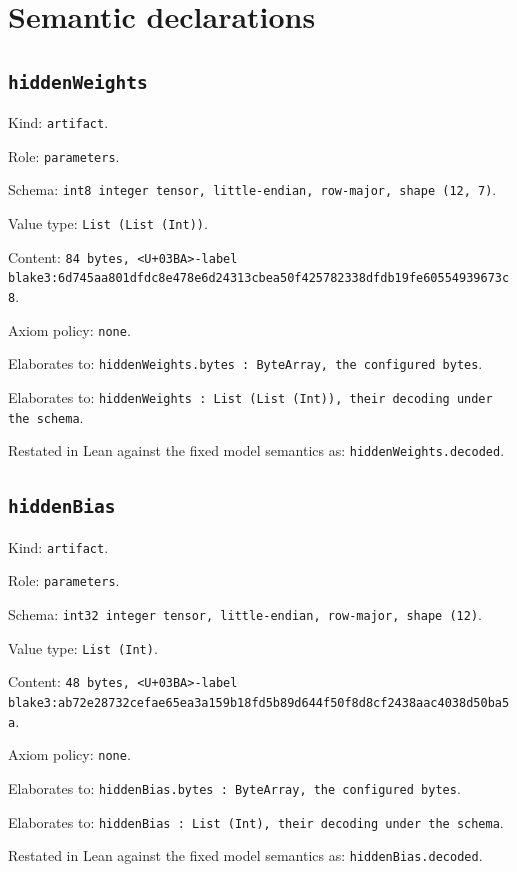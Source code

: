 \documentclass[11pt]{article}
\begin{document}
\section*{Semantic declarations}
\subsection*{\texttt{hiddenWeights}}
\noindent Kind: \texttt{artifact}.\par
\noindent Role: \texttt{parameters}.\par
\noindent Schema: \texttt{int8 integer tensor, little-endian, row-major, shape (12, 7)}.\par
\noindent Value type: \texttt{List (List (Int))}.\par
\noindent Content: \texttt{84 bytes, <U+03BA>-label blake3:6d745aa801dfdc8e478e6d24313cbea50f425782338dfdb19fe60554939673c8}.\par
\noindent Axiom policy: \texttt{none}.\par
\noindent Elaborates to: \texttt{hiddenWeights.bytes : ByteArray, the configured bytes}.\par
\noindent Elaborates to: \texttt{hiddenWeights : List (List (Int)), their decoding under the schema}.\par
\noindent Restated in Lean against the fixed model semantics as: \texttt{hiddenWeights.decoded}.\par
\subsection*{\texttt{hiddenBias}}
\noindent Kind: \texttt{artifact}.\par
\noindent Role: \texttt{parameters}.\par
\noindent Schema: \texttt{int32 integer tensor, little-endian, row-major, shape (12)}.\par
\noindent Value type: \texttt{List (Int)}.\par
\noindent Content: \texttt{48 bytes, <U+03BA>-label blake3:ab72e28732cefae65ea3a159b18fd5b89d644f50f8d8cf2438aac4038d50ba5a}.\par
\noindent Axiom policy: \texttt{none}.\par
\noindent Elaborates to: \texttt{hiddenBias.bytes : ByteArray, the configured bytes}.\par
\noindent Elaborates to: \texttt{hiddenBias : List (Int), their decoding under the schema}.\par
\noindent Restated in Lean against the fixed model semantics as: \texttt{hiddenBias.decoded}.\par
\end{document}
